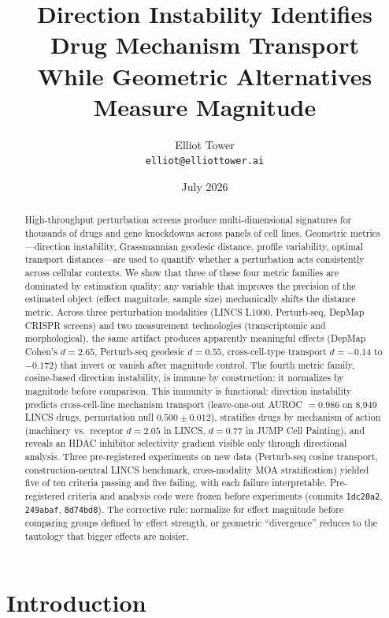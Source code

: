 \documentclass[11pt]{article}
\title{Direction Instability Identifies Drug Mechanism Transport\\
While Geometric Alternatives Measure Magnitude}
\author{Elliot Tower\\
\texttt{elliot@elliottower.ai}}
\date{July 2026}
\begin{document}
\maketitle

\begin{abstract}
High-throughput perturbation screens produce multi-dimensional signatures
for thousands of drugs and gene knockdowns across panels of cell lines.
Geometric metrics---direction instability, Grassmannian geodesic
distance, profile variability, optimal transport distances---are used to
quantify whether a perturbation acts consistently across cellular
contexts. We show that three of these four metric families are dominated
by estimation quality: any variable that improves the precision of the
estimated object (effect magnitude, sample size) mechanically shifts the
distance metric. Across three perturbation modalities (LINCS L1000,
Perturb-seq, DepMap CRISPR screens) and two measurement technologies
(transcriptomic and morphological), the same artifact produces
apparently meaningful effects (DepMap Cohen's $d = 2.65$, Perturb-seq
geodesic $d = 0.55$, cross-cell-type transport $d = -0.14$ to $-0.172$)
that invert or vanish after magnitude control. The fourth metric family,
cosine-based direction instability, is immune by construction: it
normalizes by magnitude before comparison. This immunity is functional:
direction instability predicts cross-cell-line mechanism transport
(leave-one-out AUROC $= 0.986$ on 8{,}949 LINCS drugs, permutation null
$0.500 \pm 0.012$), stratifies drugs by mechanism of action (machinery
vs.\ receptor $d = 2.05$ in LINCS, $d = 0.77$ in JUMP Cell Painting),
and reveals an HDAC inhibitor selectivity gradient visible only through
directional analysis. Three pre-registered experiments on new data
(Perturb-seq cosine transport, construction-neutral LINCS benchmark,
cross-modality MOA stratification) yielded five of ten criteria passing
and five failing, with each failure interpretable. Pre-registered
criteria and analysis code were frozen before experiments (commits
\texttt{1dc20a2}, \texttt{249abaf}, \texttt{8d74bd0}). The corrective
rule: normalize for effect magnitude before comparing groups defined by
effect strength, or geometric ``divergence'' reduces to the tautology
that bigger effects are noisier.
\end{abstract}

\section{Introduction}
\end{document}
